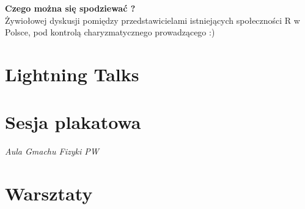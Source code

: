 \documentclass[11pt,twoside,b5paper]{book}
\begin{document}
\textbf{Czego można się spodziewać ?}\\
Żywiołowej dyskusji pomiędzy przedstawicielami istniejących społeczności R w Polsce, pod kontrolą charyzmatycznego prowadzącego :)
\newpage
\newpage
\chapter{Lightning Talks}






\newpage
\chapter{Sesja plakatowa}{\LARGE \textit{Aula Gmachu Fizyki PW}}



\newpage
\chapter{Warsztaty}{}

\newpage

\newpage

\newpage

\newpage

\newpage

\newpage

\newpage

\newpage

\newpage

\newpage

\newpage

\newpage

\newpage

\newpage

\newpage

\newpage

\newpage


\backmatter
\small \printindex[a]

\clearpage\phantom{}
 \thispagestyle{empty}
\clearpage\phantom{}
 \thispagestyle{empty}


\end{document}
